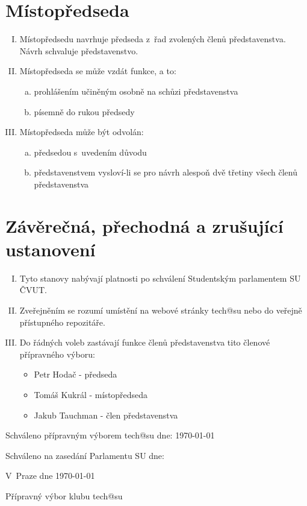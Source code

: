 \documentclass[10pt]{article}
\begin{document}
\section{Místopředseda}
	\begin{enumerate}[I.]
	\item Místopředsedu navrhuje předseda z~řad zvolených členů představenstva. Návrh schvaluje představenstvo.  
	\item Místopředseda se může vzdát funkce, a to:  
		\begin{enumerate}[a.]
		\item prohlášením učiněným osobně na schůzi představenstva
		\item písemně do rukou předsedy  
		\end{enumerate}
	\item Místopředseda může být odvolán:  
		\begin{enumerate}[a.]
		\item předsedou s~uvedením důvodu
		\item představenstvem vysloví-li se pro návrh alespoň dvě třetiny všech členů představenstva
		\end{enumerate}
	\end{enumerate}

\section{Závěrečná, přechodná a zrušující ustanovení}
	\begin{enumerate}[I.]
	\item Tyto stanovy nabývají platnosti po schválení Studentským parlamentem SU ČVUT.
	\item Zveřejněním se rozumí umístění na webové stránky tech@su nebo do veřejně přístupného repozitáře.
	\item Do řádných voleb zastávají funkce členů představenstva tito členové přípravného výboru:
		\begin{itemize}
			\item Petr Hodač - předseda
			\item Tomáš Kukrál - místopředseda
			\item Jakub Tauchman - člen představenstva
		\end{itemize}
	\end{enumerate}


\vspace{10mm}

Schváleno přípravným výborem tech@su dne: \today

Schváleno na zasedání Parlamentu SU dne:

\vspace{30mm}

\hfill V~Praze dne \today

\hfill Přípravný výbor klubu tech@su
\end{document}
